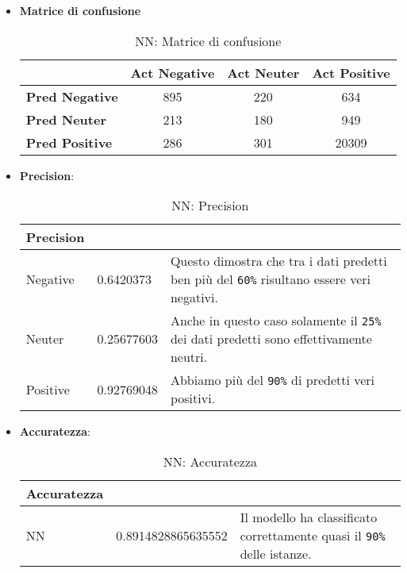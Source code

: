 			\begin{itemize}
				\item \textbf{Matrice di confusione}
				
				\begin{table} [H]
					\caption{NN: Matrice di confusione}
					\label{tab:matriceConfusioneNN}
					\centering
					\begin{tabular}{lccc}
						\toprule 
						& \textbf{Act Negative} & \textbf{Act Neuter}	& \textbf{Act Positive}\\
						\midrule
						\textbf{Pred Negative}  & 895 & 220 & 634\\
						\textbf{Pred Neuter} & 213 & 180 & 949\\
						\textbf{Pred Positive} & 286 & 301 & 20309\\
						\bottomrule
					\end{tabular}
				\end{table}
				
				\item \textbf{Precision}:				
				\begin{table} [H]
					\caption{NN: Precision}
					\label{tab:precisionNN}
					\centering
					\begin{tabular}{llp{}}
						\toprule 
						\textbf{Precision}	\\
						\midrule
						Negative  & 0.6420373  & Questo dimostra che tra i dati predetti ben più del \verb|60%| risultano essere veri negativi.\\
						Neuter & 0.25677603 & Anche in questo caso solamente il \verb|25%| dei dati predetti sono effettivamente neutri.\\
						Positive & 0.92769048 & Abbiamo più del \verb|90%| di predetti veri positivi.\\
						\bottomrule
					\end{tabular}
				\end{table}
				
				\item \textbf{Accuratezza}: 
				
				\begin{table} [H]
					\caption{NN: Accuratezza}
					\label{tab:accNN}
					\centering
					\begin{tabular}{llp{}}
						\toprule 
						\textbf{Accuratezza}	\\
						\midrule
						NN  & 0.8914828865635552 & Il modello ha classificato correttamente quasi il \verb|90%| delle istanze.\\
						\bottomrule
					\end{tabular}
				\end{table}
				

\end{itemize}
